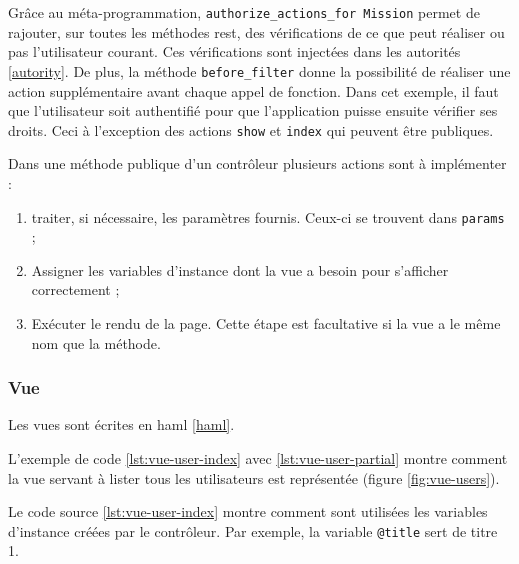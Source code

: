 \begin{figure}
\end{figure}

Grâce au méta-programmation, \lstinline[language=Rails]{authorize_actions_for Mission} permet de rajouter, sur toutes les méthodes \gls{rest}, des vérifications de ce que peut réaliser ou pas l'utilisateur courant. Ces vérifications sont injectées dans les autorités \ref{autority}. De plus, la méthode \lstinline[language=Rails]{before_filter} donne la possibilité de réaliser une action supplémentaire avant chaque appel de fonction. Dans cet exemple, il faut que l'utilisateur soit authentifié pour que l'application puisse ensuite vérifier ses droits. Ceci à l'exception des actions \texttt{show} et \texttt{index} qui peuvent être publiques.

Dans une méthode publique d'un contrôleur plusieurs actions sont à implémenter :
\begin{enumerate}
  \item traiter, si nécessaire, les paramètres fournis. Ceux-ci se trouvent dans \lstinline[language=Rails]{params} ;
  \item Assigner les variables d'instance dont la vue a besoin pour s'afficher correctement ;
  \item Exécuter le rendu de la page. Cette étape est facultative si la vue a le même nom que la méthode.
\end{enumerate}

\subsubsection{Vue}
\label{vues}
Les vues sont écrites en haml \ref{haml}.

L'exemple de code \ref{lst:vue-user-index} avec \ref{lst:vue-user-partial} montre comment la vue servant à lister tous les utilisateurs est représentée (figure \ref{fig:vue-users}).

\begin{figure}

\end{figure}

Le code source \ref{lst:vue-user-index} montre comment sont utilisées les variables d'instance créées par le contrôleur. Par exemple, la variable \texttt{@title} sert de titre 1.

